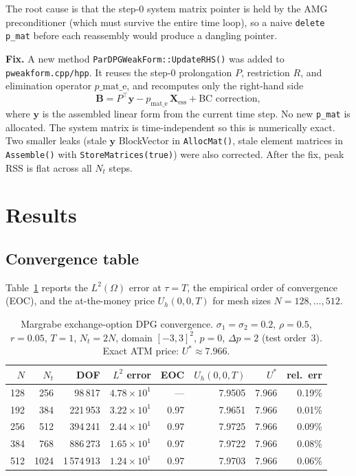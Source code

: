 \documentclass[11pt,a4paper]{article}
\begin{document}
The root cause is that the step-0 system matrix pointer is held by the AMG
preconditioner (which must survive the entire time loop), so a naive
\texttt{delete p\_mat} before each reassembly would produce a dangling pointer.

\textbf{Fix.} A new method \texttt{ParDPGWeakForm::UpdateRHS()} was added to
\texttt{pweakform.cpp/hpp}.  It reuses the step-0 prolongation $P$, restriction $R$,
and elimination operator $p\_\mathrm{mat\_e}$, and recomputes only the right-hand side
\[
  \mathbf{B} = P^\top \mathbf{y} - p_\mathrm{mat\_e}\,\mathbf{X}_\mathrm{ess}
  + \text{BC correction},
\]
where $\mathbf{y}$ is the assembled linear form from the current time step.
No new \texttt{p\_mat} is allocated.  The system matrix is time-independent so this
is numerically exact.  Two smaller leaks (stale $\mathbf{y}$ BlockVector in
\texttt{AllocMat()}, stale element matrices in \texttt{Assemble()} with
\texttt{StoreMatrices(true)}) were also corrected.  After the fix, peak RSS is flat
across all $N_t$ steps.

\section{Results}

\subsection{Convergence table}

Table~\ref{tab:margrabe-convergence} reports the $L^2(\Omega)$ error at $\tau=T$,
the empirical order of convergence (EOC), and the at-the-money price
$U_h(0,0,T)$ for mesh sizes $N=128,\ldots,512$.

\begin{table}[htbp]
\centering
\caption{Margrabe exchange-option DPG convergence.
$\sigma_1=\sigma_2=0.2$, $\rho=0.5$, $r=0.05$, $T=1$,
$N_t=2N$, domain $[-3,3]^2$, $p=0$, $\Delta p=2$ (test order~3).
Exact ATM price: $U^*\approx 7.966$.}
\label{tab:margrabe-convergence}
\begin{tabular}{rrrrrrrr}
\toprule
$N$ & $N_t$ & DOF & $L^2$ error & EOC & $U_h(0,0,T)$ & $U^*$ & rel.\ err \\
\midrule
 128 &  256 &   98\,817 & $4.78\times10^{1}$ & ---  & 7.9505 & 7.966 & 0.19\% \\
 192 &  384 &  221\,953 & $3.22\times10^{1}$ & 0.97 & 7.9651 & 7.966 & 0.01\% \\
 256 &  512 &  394\,241 & $2.44\times10^{1}$ & 0.97 & 7.9725 & 7.966 & 0.09\% \\
 384 &  768 &  886\,273 & $1.65\times10^{1}$ & 0.97 & 7.9722 & 7.966 & 0.08\% \\
 512 & 1024 & 1\,574\,913 & $1.24\times10^{1}$ & 0.97 & 7.9703 & 7.966 & 0.06\% \\
\bottomrule
\end{tabular}
\end{table}
\end{document}
